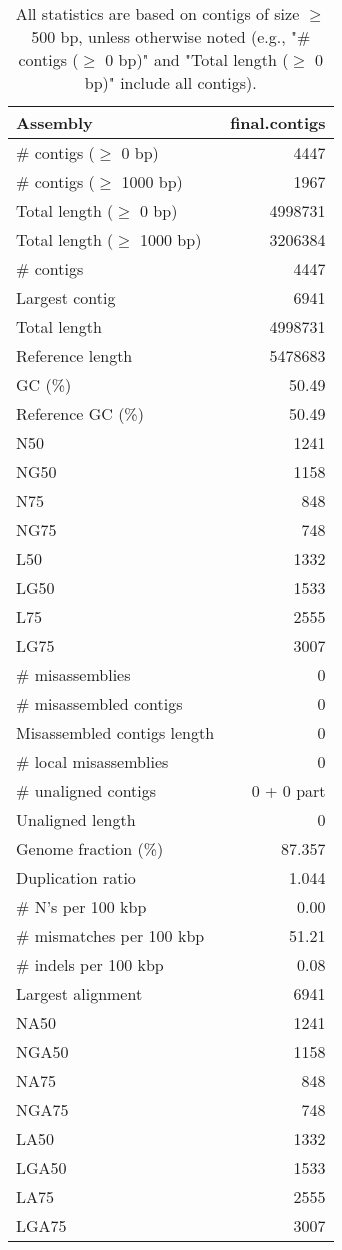 \documentclass[12pt,a4paper]{article}
\begin{document}
\begin{table}[ht]
\begin{center}
\caption{All statistics are based on contigs of size $\geq$ 500 bp, unless otherwise noted (e.g., "\# contigs ($\geq$ 0 bp)" and "Total length ($\geq$ 0 bp)" include all contigs).}
\begin{tabular}{|l*{1}{|r}|}
\hline
Assembly & final.contigs \\ \hline
\# contigs ($\geq$ 0 bp) & 4447 \\ \hline
\# contigs ($\geq$ 1000 bp) & 1967 \\ \hline
Total length ($\geq$ 0 bp) & 4998731 \\ \hline
Total length ($\geq$ 1000 bp) & 3206384 \\ \hline
\# contigs & 4447 \\ \hline
Largest contig & 6941 \\ \hline
Total length & 4998731 \\ \hline
Reference length & 5478683 \\ \hline
GC (\%) & 50.49 \\ \hline
Reference GC (\%) & 50.49 \\ \hline
N50 & 1241 \\ \hline
NG50 & 1158 \\ \hline
N75 & 848 \\ \hline
NG75 & 748 \\ \hline
L50 & 1332 \\ \hline
LG50 & 1533 \\ \hline
L75 & 2555 \\ \hline
LG75 & 3007 \\ \hline
\# misassemblies & 0 \\ \hline
\# misassembled contigs & 0 \\ \hline
Misassembled contigs length & 0 \\ \hline
\# local misassemblies & 0 \\ \hline
\# unaligned contigs & 0 + 0 part \\ \hline
Unaligned length & 0 \\ \hline
Genome fraction (\%) & 87.357 \\ \hline
Duplication ratio & 1.044 \\ \hline
\# N's per 100 kbp & 0.00 \\ \hline
\# mismatches per 100 kbp & 51.21 \\ \hline
\# indels per 100 kbp & 0.08 \\ \hline
Largest alignment & 6941 \\ \hline
NA50 & 1241 \\ \hline
NGA50 & 1158 \\ \hline
NA75 & 848 \\ \hline
NGA75 & 748 \\ \hline
LA50 & 1332 \\ \hline
LGA50 & 1533 \\ \hline
LA75 & 2555 \\ \hline
LGA75 & 3007 \\ \hline
\end{tabular}
\end{center}
\end{table}
\end{document}
